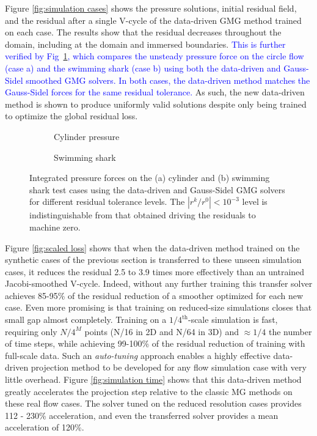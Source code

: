 \documentclass[]{elsarticle}
\begin{document}
Figure \ref{fig:simulation cases} shows the pressure solutions, initial residual field, and the residual after a single V-cycle of the data-driven GMG method trained on each case. The results show that the residual decreases throughout the domain, including at the domain and immersed boundaries. \textcolor{blue}{This is further verified by Fig~\ref{fig:simulation forces}, which compares the unsteady pressure force on the circle flow (case a) and the swimming shark (case b) using both the data-driven and Gauss-Sidel smoothed GMG solvers. In both cases, the data-driven method matches the Gauss-Sidel forces for the same residual tolerance.} As such, the new data-driven method is shown to produce uniformly valid solutions despite only being trained to optimize the global residual loss.

\begin{figure}
    \centering
    \begin{subfigure}[b]{0.47\textwidth}
        \centering
        \caption{Cylinder pressure}
    \end{subfigure}
    \hfill
    \begin{subfigure}[b]{0.47\textwidth}
        \centering
        \caption{Swimming shark}
    \end{subfigure}
    \caption{Integrated pressure forces on the (a) cylinder and (b) swimming shark test cases using the data-driven and Gauss-Sidel GMG solvers for different residual tolerance levels. The $|r^k/r^0|<10^{-3}$ level is indistinguishable from that obtained driving the residuals to machine zero.}
    \label{fig:simulation forces}
\end{figure}

Figure \ref{fig:scaled loss} shows that when the data-driven method trained on the synthetic cases of the previous section is transferred to these unseen simulation cases, it reduces the residual 2.5 to 3.9 times more effectively than an untrained Jacobi-smoothed V-cycle. Indeed, without any further training this transfer solver achieves 85-95\% of the residual reduction of a smoother optimized for each new case. Even more promising is that training on reduced-size simulations closes that small gap almost completely. Training on a $1/4^\text{th}$-scale simulation is fast, requiring only $N/4^M$ points (N/16 in 2D and N/64 in 3D) and $\approx 1/4$ the number of time steps, while achieving 99-100\% of the residual reduction of training with full-scale data. Such an \textit{auto-tuning} approach enables a highly effective data-driven projection method to be developed for any flow simulation case with very little overhead. Figure \ref{fig:simulation time} shows that this data-driven method greatly accelerates the projection step relative to the classic MG methods on these real flow cases. The solver tuned on the reduced resolution cases provides 112 - 230\% acceleration, and even the transferred solver provides a mean acceleration of 120\%. 
\end{document}
